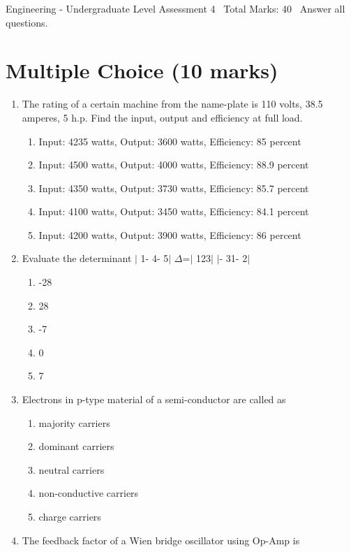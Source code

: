 \documentclass[12pt]{article}
\begin{document}
\begin{center}
Engineering - Undergraduate Level Assessment 4 \
Total Marks: 40 \
Answer all questions.
\end{center}

\section*{Multiple Choice (10 marks)}
\begin{enumerate}[label=\arabic*.]
\item The rating of a certain machine from the name-plate is 110 volts, 38.5 amperes, 5 h.p. Find the input, output and efficiency at full load.
\begin{enumerate}[label=(\alph*)]
    \item Input: 4235 watts, Output: 3600 watts, Efficiency: 85 percent
    \item Input: 4500 watts, Output: 4000 watts, Efficiency: 88.9 percent
    \item Input: 4350 watts, Output: 3730 watts, Efficiency: 85.7 percent
    \item Input: 4100 watts, Output: 3450 watts, Efficiency: 84.1 percent
    \item Input: 4200 watts, Output: 3900 watts, Efficiency: 86 percent
\end{enumerate}
\item Evaluate the determinant \ensuremath{\vert} 1- 4- 5\ensuremath{\vert} \ensuremath{\Delta}=\ensuremath{\vert} 123\ensuremath{\vert} \ensuremath{\vert}- 31- 2\ensuremath{\vert}
\begin{enumerate}[label=(\alph*)]
    \item -28
    \item 28
    \item -7
    \item 0
    \item 7
\end{enumerate}
\item Electrons in p-type material of a semi-conductor are called as
\begin{enumerate}[label=(\alph*)]
    \item majority carriers
    \item dominant carriers
    \item neutral carriers
    \item non-conductive carriers
    \item charge carriers
\end{enumerate}
\item The feedback factor of a Wien bridge oscillator using Op-Amp is

\end{enumerate}
\end{document}
